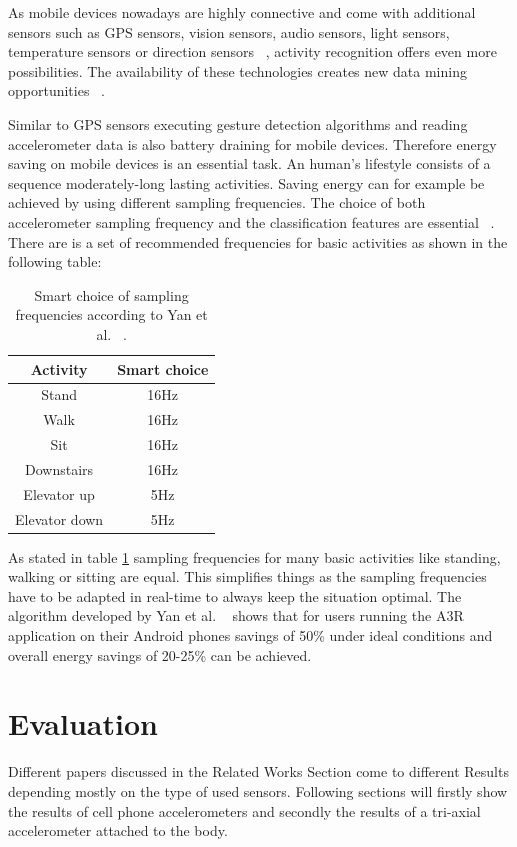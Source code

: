 \documentclass[conference]{IEEEtran}
\begin{document}
As mobile devices nowadays are highly connective and come with additional sensors such as \ac{GPS} sensors, vision sensors, audio sensors, light sensors, temperature sensors or direction sensors ~\cite{Kwapisz2011}, activity recognition offers even more possibilities. The availability of these technologies creates new data mining opportunities ~\cite{Kwapisz2011}.

Similar to \ac{GPS} sensors executing gesture detection algorithms and reading accelerometer data is also battery draining for mobile devices. Therefore energy saving on mobile devices is an essential task. An human's lifestyle consists of a sequence moderately-long lasting activities. Saving energy can for example be achieved by using different sampling frequencies. The choice of both accelerometer sampling frequency and the classification features are essential ~\cite{Yan2012}. There are is a set of recommended frequencies for basic activities as shown in the following table:

\begin{table}[!htb]
\centering
\begin{tabular}{|c|c|}
\hline
\textbf{Activity} & \textbf{Smart choice} \\
\hline
Stand & 16Hz \\
\hline
Walk & 16Hz \\
\hline
Sit & 16Hz \\
\hline
Downstairs & 16Hz \\
\hline
Elevator up & 5Hz \\
\hline
Elevator down & 5Hz \\
\hline
\end{tabular}
\caption{Smart choice of sampling frequencies according to Yan et al. ~\cite{Yan2012}.}
\label{tab:smartFrequencies}
\end{table}

As stated in table \ref{tab:smartFrequencies} sampling frequencies for many basic activities like standing, walking or sitting are equal. This simplifies things as the sampling frequencies have to be adapted in real-time to always keep the situation optimal.
The algorithm developed by Yan et al. ~\cite{Yan2012} shows that for users running
the A3R application on their Android phones savings of 50\% under ideal conditions and overall energy savings of 20-25\% can be achieved.


\section{Evaluation}
Different papers discussed in the Related Works Section come to different Results depending mostly on the type of used sensors. Following sections will firstly show the results of cell phone accelerometers and secondly the results of a tri-axial accelerometer attached to the body.
\end{document}
